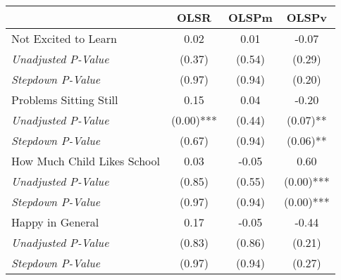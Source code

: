 \begin{tabular}{l c c c}
\toprule
 & OLSR & OLSPm & OLSPv \\
\midrule
Not Excited to Learn & 0.02 & 0.01 & -0.07 \\
\quad \textit{Unadjusted P-Value} & (0.37) & (0.54) & (0.29) \\
\quad \textit{Stepdown P-Value} & (0.97) & (0.94) & (0.20) \\
Problems Sitting Still & 0.15 & 0.04 & -0.20 \\
\quad \textit{Unadjusted P-Value} & (0.00)*** & (0.44) & (0.07)** \\
\quad \textit{Stepdown P-Value} & (0.67) & (0.94) & (0.06)** \\
How Much Child Likes School & 0.03 & -0.05 & 0.60 \\
\quad \textit{Unadjusted P-Value} & (0.85) & (0.55) & (0.00)*** \\
\quad \textit{Stepdown P-Value} & (0.97) & (0.94) & (0.00)*** \\
Happy in General & 0.17 & -0.05 & -0.44 \\
\quad \textit{Unadjusted P-Value} & (0.83) & (0.86) & (0.21) \\
\quad \textit{Stepdown P-Value} & (0.97) & (0.94) & (0.27) \\
\bottomrule
\end{tabular}
